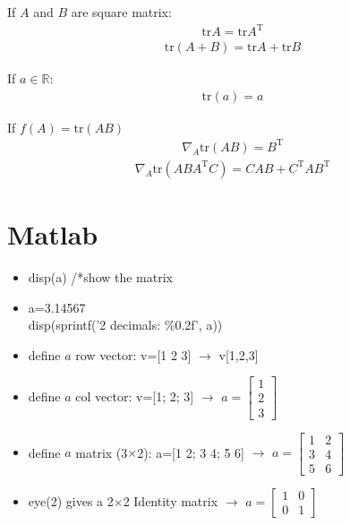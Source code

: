 \documentclass[a4paper,12pt]{report}
\begin{document}
\begin{appendices}
If $A$ and $B$ are square matrix:
\begin{align*}
		\mathrm{tr} A = \mathrm{tr} A^{\mathrm{T}}
\end{align*}
\begin{align*}
		\mathrm{tr} (A+B) = \mathrm{tr} A + \mathrm{tr} B
\end{align*}

If $a \in \mathbb{R}$:
\begin{align*}
		\mathrm{tr} (a) = a
\end{align*}

If $f(A) = \mathrm{tr}(AB)$
\begin{align*}
		\nabla_A \mathrm{tr} (A B) = B^{\mathrm{T}}
\end{align*}
\begin{align*}
		\nabla_A \mathrm{tr} (A BA^{\mathrm{T}}C) = CAB + C^{\mathrm{T}}AB^{\mathrm{T}}
\end{align*}

\chapter{Matlab}
\begin{itemize}
\item disp(a) /*show the matrix
\item a=3.14567 \\
disp(sprintf('2 decimals: \%0.2f', a))

\item define $a$ row vector: v=[1 2 3]  $\rightarrow$ v[1,2,3]

\item define $a$ col vector: v=[1; 2; 3]  $\rightarrow$ $a = \left[ \begin{smallmatrix} 1 \\ 2 \\ 3 \end{smallmatrix} \right]$

\item define $a$ matrix (3$\times$2): a=[1 2; 3 4; 5 6] $\rightarrow$ $a = \left[ \begin{smallmatrix} 1 & 2\\ 3 & 4 \\ 5 & 6 \end{smallmatrix} \right]$

\item eye(2) gives a 2$\times$2 Identity matrix $\rightarrow$ $a = \left[ \begin{smallmatrix} 1 & 0 \\ 0 & 1  \end{smallmatrix} \right]$


\end{itemize}
\end{appendices}
\end{document}
